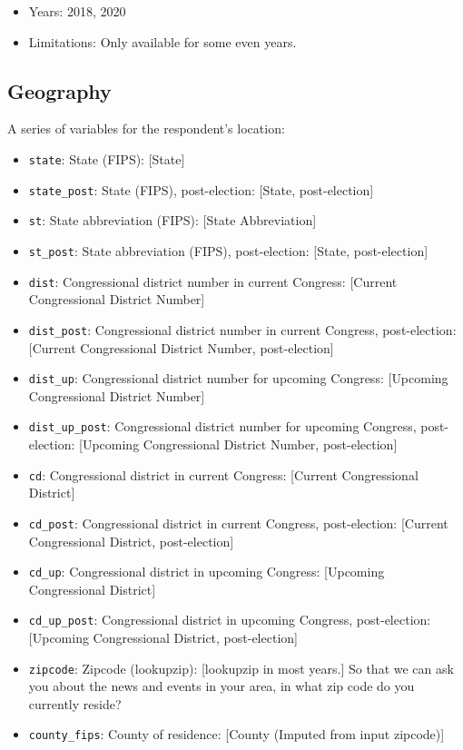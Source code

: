 \documentclass[10pt,article,oneside]{memoir}
\theoremstyle{definition}
\begin{document}
\begin{itemize}
\tightlist
\item
  Years: 2018, 2020
\item
  Limitations: Only available for some even years.
\end{itemize}

\hypertarget{geography}{%
\subsection{Geography}\label{geography}}

A series of variables for the respondent's location:

\begin{itemize}
\tightlist
\item
  \texttt{state}: State (FIPS): {[}State{]}
\item
  \texttt{state\_post}: State (FIPS), post-election: {[}State,
  post-election{]}
\item
  \texttt{st}: State abbreviation (FIPS): {[}State Abbreviation{]}
\item
  \texttt{st\_post}: State abbreviation (FIPS), post-election: {[}State,
  post-election{]}
\item
  \texttt{dist}: Congressional district number in current Congress:
  {[}Current Congressional District Number{]}
\item
  \texttt{dist\_post}: Congressional district number in current
  Congress, post-election: {[}Current Congressional District Number,
  post-election{]}
\item
  \texttt{dist\_up}: Congressional district number for upcoming
  Congress: {[}Upcoming Congressional District Number{]}
\item
  \texttt{dist\_up\_post}: Congressional district number for upcoming
  Congress, post-election: {[}Upcoming Congressional District Number,
  post-election{]}
\item
  \texttt{cd}: Congressional district in current Congress: {[}Current
  Congressional District{]}
\item
  \texttt{cd\_post}: Congressional district in current Congress,
  post-election: {[}Current Congressional District, post-election{]}
\item
  \texttt{cd\_up}: Congressional district in upcoming Congress:
  {[}Upcoming Congressional District{]}
\item
  \texttt{cd\_up\_post}: Congressional district in upcoming Congress,
  post-election: {[}Upcoming Congressional District, post-election{]}
\item
  \texttt{zipcode}: Zipcode (lookupzip): {[}lookupzip in most years.{]}
  So that we can ask you about the news and events in your area, in what
  zip code do you currently reside?
\item
  \texttt{county\_fips}: County of residence: {[}County (Imputed from
  input zipcode){]}
\end{itemize}
\end{document}
